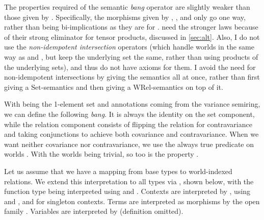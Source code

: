 
The properties required of the semantic \emph{bang} operator are slightly
weaker than those given by \citet{AbelBernardy2020}.
Specifically, the morphisms given by , ,
and  only go one way, rather than being
bi-implications as they are for \citet{AbelBernardy2020}.
\citeauthor{AbelBernardy2020} need the stronger laws because of their strong
eliminator for tensor products, discussed in \cref{sec:alt}.
Also, I do not use the \emph{non-idempotent intersection} operators (which
handle worlds in the same way as  and
, but keep the
underlying set the same, rather than using products of the underlying sets),
and thus do not have axioms for them.
I avoid the need for non-idempotent intersections by giving the semantics all at
once, rather than first giving a $\mathrm{Set}$-semantics and then giving a
$\mathrm{WRel}$-semantics on top of it.

\begin{example}
  With  being the 1-element set and annotations coming from the
  variance semiring, we can define the following \emph{bang}.
  It is always the identity on the set component, while the relation component
  consists of flipping the relation for contravariance and taking conjunctions
  to achieve both covariance and contravariance.
  When we want neither covariance nor contravariance, we use the always true
  predicate on worlds .
  With the worlds being trivial, so too is the property .

\end{example}

%
%
%

Let us assume that we have a mapping
\AgdaBound{$\upiota\llbracket$\_$\rrbracket$} from base types to world-indexed
relations.
We extend this interpretation to all types via
\AgdaFunction{$\llbracket$\_$\rrbracket$}, shown below, with
the function type being interpreted using  and
.
Contexts are interpreted by , using
 and , and 
for singleton contexts.
Terms are interpreted as morphisms by the open family
\AgdaFunction{$\llbracket$\_$\vdash$\_$\rrbracket$}.
Variables are interpreted by  (definition omitted).

